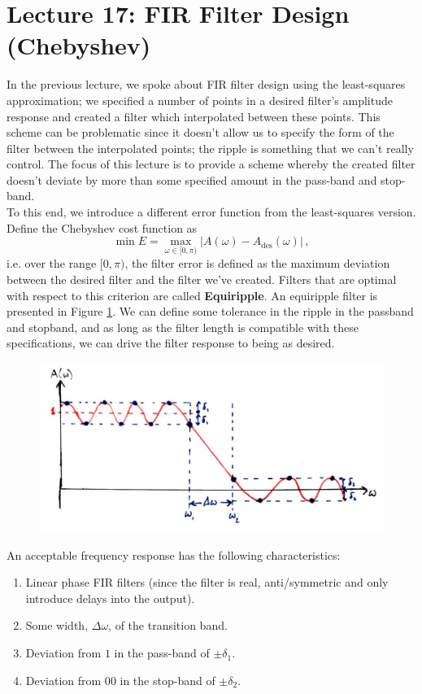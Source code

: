 \section{Lecture 17: FIR Filter Design (Chebyshev)}

In the previous lecture, we spoke about FIR filter design using the
least-squares approximation; we specified a number of points in
a desired filter's amplitude response and created a filter which
interpolated between these points. This scheme can be problematic
since it doesn't allow us to specify the form of the filter
between the interpolated points; the ripple is something that we
can't really control. The focus of this lecture is to provide a
scheme whereby the created filter doesn't deviate by more than
some specified amount in the pass-band and stop-band.\\
%
To this end, we introduce a different error function from the
least-squares version. Define the Chebyshev cost function as
%
\begin{displaymath}
  \min E = \max_{\omega\in[0,\pi)} \lvert A(\omega) - A_\mathrm{des}(\omega)\rvert \,,
\end{displaymath}
%
i.e. over the range $[0,\pi)$, the filter error is defined as the
maximum deviation between the desired filter and the filter we've
created. Filters that are optimal with respect to this criterion
are called \textbf{Equiripple}. An equiripple filter is presented
in Figure \ref{fig::lecture_17_equiripple}. We can define some
tolerance in the ripple in the
passband and stopband, and as long as the filter length is
compatible with these specifications, we can drive the filter
response to being as desired.\\
%
\begin{figure}[!htb]
  \includegraphics[width=\textwidth]{images/lecture_17_equiripple.JPG}
  \caption{
  }
  \label{fig::lecture_17_equiripple}
\end{figure}
%
An acceptable frequency response has the following characteristics:
%
\begin{enumerate}
\item Linear phase FIR filters (since the filter is real, anti/symmetric
  and only introduce delays into the output).
\item Some width, $\Delta\omega$, of the transition band.
\item Deviation from $1$ in the pass-band of $\pm\delta_1$.
\item Deviation from 0$0$ in the stop-band of $\pm\delta_2$.
\end{enumerate}


